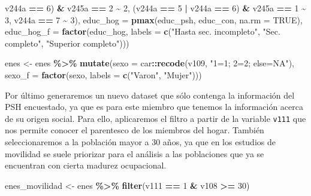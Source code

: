 \documentclass[
]{article}
\newenvironment{Shaded}{\begin{snugshade}}{\end{snugshade}}
\newcommand{\AttributeTok}[1]{\textcolor[rgb]{0.13,0.29,0.53}{#1}}
\newcommand{\ConstantTok}[1]{\textcolor[rgb]{0.56,0.35,0.01}{#1}}
\newcommand{\DecValTok}[1]{\textcolor[rgb]{0.00,0.00,0.81}{#1}}
\newcommand{\FunctionTok}[1]{\textcolor[rgb]{0.13,0.29,0.53}{\textbf{#1}}}
\newcommand{\NormalTok}[1]{#1}
\newcommand{\OtherTok}[1]{\textcolor[rgb]{0.56,0.35,0.01}{#1}}
\newcommand{\SpecialCharTok}[1]{\textcolor[rgb]{0.81,0.36,0.00}{\textbf{#1}}}
\newcommand{\StringTok}[1]{\textcolor[rgb]{0.31,0.60,0.02}{#1}}
\begin{document}
\begin{Shaded}
\begin{Highlighting}[]
\NormalTok{        v244a }\SpecialCharTok{==} \DecValTok{6}\NormalTok{) }\SpecialCharTok{\&}\NormalTok{ v245a }\SpecialCharTok{==} \DecValTok{2} \SpecialCharTok{\textasciitilde{}} \DecValTok{2}\NormalTok{, (v244a }\SpecialCharTok{==} \DecValTok{5} \SpecialCharTok{|}\NormalTok{ v244a }\SpecialCharTok{==} \DecValTok{6}\NormalTok{) }\SpecialCharTok{\&}\NormalTok{ v245a }\SpecialCharTok{==} \DecValTok{1} \SpecialCharTok{\textasciitilde{}} \DecValTok{3}\NormalTok{,}
\NormalTok{        v244a }\SpecialCharTok{==} \DecValTok{7} \SpecialCharTok{\textasciitilde{}} \DecValTok{3}\NormalTok{), }\AttributeTok{educ\_hog =} \FunctionTok{pmax}\NormalTok{(educ\_psh, educ\_con, }\AttributeTok{na.rm =} \ConstantTok{TRUE}\NormalTok{), }\AttributeTok{educ\_hog\_f =} \FunctionTok{factor}\NormalTok{(educ\_hog,}
        \AttributeTok{labels =} \FunctionTok{c}\NormalTok{(}\StringTok{"Hasta sec. incompleto"}\NormalTok{, }\StringTok{"Sec. completo"}\NormalTok{, }\StringTok{"Superior completo"}\NormalTok{)))}

\NormalTok{enes }\OtherTok{\textless{}{-}}\NormalTok{ enes }\SpecialCharTok{\%\textgreater{}\%}
    \FunctionTok{mutate}\NormalTok{(}\AttributeTok{sexo =}\NormalTok{ car}\SpecialCharTok{::}\FunctionTok{recode}\NormalTok{(v109, }\StringTok{"1=1; 2=2; else=NA"}\NormalTok{), }\AttributeTok{sexo\_f =} \FunctionTok{factor}\NormalTok{(sexo, }\AttributeTok{labels =} \FunctionTok{c}\NormalTok{(}\StringTok{"Varon"}\NormalTok{,}
        \StringTok{"Mujer"}\NormalTok{)))}
\end{Highlighting}
\end{Shaded}

Por último generaremos un nuevo dataset que sólo contenga la información del PSH encuestado, ya que es para este miembro que tenemos la información acerca de su origen social. Para ello, aplicaremos el filtro a partir de la variable \texttt{v111} que nos permite conocer el parentesco de los miembros del hogar. También seleccionaremos a la población mayor a 30 años, ya que en los estudios de movilidad se suele priorizar para el análisis a las poblaciones que ya se encuentran con cierta madurez ocupacional.

\begin{Shaded}
\begin{Highlighting}[]
\NormalTok{enes\_movilidad }\OtherTok{\textless{}{-}}\NormalTok{ enes }\SpecialCharTok{\%\textgreater{}\%}
    \FunctionTok{filter}\NormalTok{(v111 }\SpecialCharTok{==} \DecValTok{1} \SpecialCharTok{\&}\NormalTok{ v108 }\SpecialCharTok{\textgreater{}=} \DecValTok{30}\NormalTok{)}
\end{Highlighting}
\end{Shaded}
\end{document}
